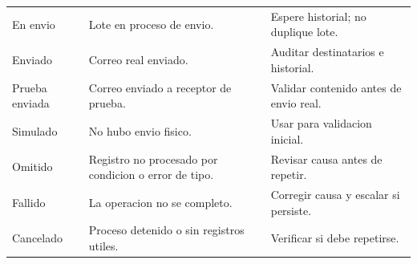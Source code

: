 \begin{longtable}{p{4.0cm}p{6.6cm}p{4.3cm}}
En envio & Lote en proceso de envio. & Espere historial; no duplique lote.\\
Enviado & Correo real enviado. & Auditar destinatarios e historial.\\
Prueba enviada & Correo enviado a receptor de prueba. & Validar contenido antes de envio real.\\
Simulado & No hubo envio fisico. & Usar para validacion inicial.\\
Omitido & Registro no procesado por condicion o error de tipo. & Revisar causa antes de repetir.\\
Fallido & La operacion no se completo. & Corregir causa y escalar si persiste.\\
Cancelado & Proceso detenido o sin registros utiles. & Verificar si debe repetirse.\\
\bottomrule
\end{longtable}
